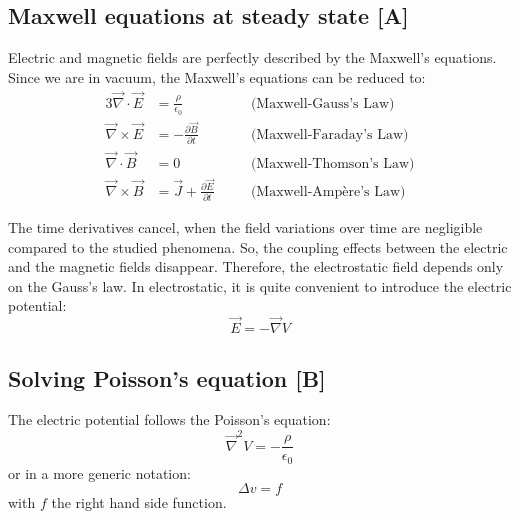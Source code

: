 \begin{refsection}

  \subsection{Maxwell equations at steady state [A]}
  Electric and magnetic fields are perfectly described by the Maxwell's equations. Since we are in vacuum, the Maxwell's equations can be reduced to:
  \begin{alignat*}{3}
    \overrightarrow{\nabla} \cdot \overrightarrow{E}  & = \frac{\rho}{\epsilon_{0}}\quad                                           &  & \text{(Maxwell-Gauss's Law)}   \\
    \overrightarrow{\nabla} \times \overrightarrow{E} & = - \frac{\partial \overrightarrow{B}}{\partial t}\quad                    &  & \text{(Maxwell-Faraday's Law)} \\
    \overrightarrow{\nabla} \cdot \overrightarrow{B}  & = 0\quad                                                                   &  & \text{(Maxwell-Thomson's Law)} \\
    \overrightarrow{\nabla} \times \overrightarrow{B} & = \overrightarrow{J} + \frac{\partial \overrightarrow{E}}{\partial t}\quad &  & \text{(Maxwell-Ampère's Law)}
  \end{alignat*}

  The time derivatives cancel, when the field variations over time are negligible compared to the studied phenomena. So, the coupling effects between the electric and the magnetic fields disappear. Therefore, the electrostatic field depends only on the Gauss’s law. In electrostatic, it is quite convenient to introduce the electric potential:
  \begin{equation}
    \vec{E} = - \vec{\nabla}V
  \end{equation}

  \subsection{Solving Poisson's equation [B]}
  The electric potential follows the Poisson's equation:
  \begin{equation}
    \vec{\nabla}^{2}V = -\frac{\rho}{\epsilon_{0}}
  \end{equation}
  or in a more generic notation:
  \begin{equation}
    \Delta v = f
  \end{equation}
  with $f$ the right hand side function.


\end{refsection}
